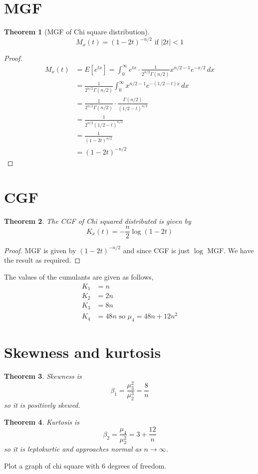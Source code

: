 \documentclass[oneside,11pt,pdftex]{book}%
\numberwithin{equation}{section}
\newtheorem{theorem}{Theorem}[chapter]%
\numberwithin{section}{chapter}
\numberwithin{equation}{chapter}
\begin{document}
\section{MGF}
\begin{theorem}[MGF of Chi square distribution]
	\[ M_x(t) = (1-2t)^{-n/2} \text{ if } |2t|<1\]
\end{theorem}
\begin{proof}
	\begin{align*}
		M_x(t)&=E[e^{tx}]=\int_0^{\infty}e^{tx}\cdot \frac {1}{2^{n/2}\Gamma (n/2)}x^{n/2-1}e^{-x/2} \, dx\\
		&=\frac{1}{2^{n/2}\Gamma(n/2)} \int_0^\infty x^{n/2-1}e^{-(1/2-t)x}\, dx\\
		&=\frac{1}{2^{n/2}\Gamma(n/2)}\cdot \frac{\Gamma(n/2)}{(1/2-t)^{n/2}}\\
		&=\frac{1}{2^{n/2}(1/2-t)^{n/2}}\\
		&=\frac{1}{(1-2t)^{n/2}}\\
		&=(1-2t)^{-n/2}
	\end{align*}
\end{proof}
\section{CGF}
\begin{theorem}
	The CGF of Chi squared distributed is given by \[ K_x(t) = -\frac{n}{2} \log (1-2t)\]
\end{theorem}
\begin{proof}
	MGF is given by $ (1-2t)^{-n/2} $ and since CGF is just $ \log  $ MGF. We have the result as required.
\end{proof}
The values of the cumulants are given as follows,
\begin{align*}
	K_1 &= n\\
	K_2 &= 2n\\
	K_3 &= 8n\\
	K_4 &= 48n \text{ so } \mu_4=48n+12n^2
\end{align*}

\section{Skewness and kurtosis}
\begin{theorem}
	Skewness is \[ \beta_1=\frac{\mu_3^2}{\mu_2^3}=\frac{8}{n} \] so it is positively skewed.
\end{theorem}
\begin{theorem}
	Kurtosis is \[ \beta_2=\frac{\mu_4}{\mu_2^2}= 3+\frac{12}{n}\] so it is leptokurtic and approaches normal as $ n \rightarrow \infty $.
\end{theorem}
Plot a graph of chi square with 6 degrees of freedom.
\end{document}
